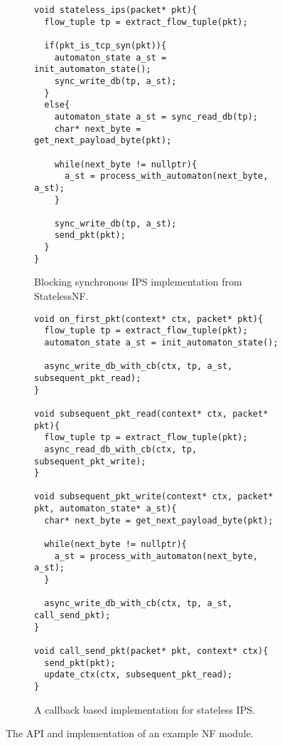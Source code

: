 \begin{figure}[!t]
	\begin{subfigure}[b]{\columnwidth}
		\centering
 	 	\lstset{language=C, numbers=left, showspaces=false,
    		showstringspaces=false, tabsize=2, breaklines=true,
    		xleftmargin=5.0ex, basicstyle=\scriptsize,
		}

		\begin{lstlisting}
void stateless_ips(packet* pkt){
  flow_tuple tp = extract_flow_tuple(pkt);

  if(pkt_is_tcp_syn(pkt)){
    automaton_state a_st = init_automaton_state();
    sync_write_db(tp, a_st);
  }
  else{
    automaton_state a_st = sync_read_db(tp);
    char* next_byte = get_next_payload_byte(pkt);

    while(next_byte != nullptr){
      a_st = process_with_automaton(next_byte, a_st);
    }

    sync_write_db(tp, a_st);
    send_pkt(pkt);
  }
}
		\end{lstlisting}
		\caption{Blocking synchronous IPS implementation from StatelessNF.}
		\label{fig:api}
    \end{subfigure}\hfill
	\begin{subfigure}[b]{\columnwidth}
		\centering
 	 	\lstset{language=C++, numbers=left, showspaces=false,
    		showstringspaces=false, tabsize=2, breaklines=true,
    		xleftmargin=5.0ex, basicstyle=\scriptsize,
		}

		\begin{lstlisting}
void on_first_pkt(context* ctx, packet* pkt){
  flow_tuple tp = extract_flow_tuple(pkt);
  automaton_state a_st = init_automaton_state();

  async_write_db_with_cb(ctx, tp, a_st, subsequent_pkt_read);
}

void subsequent_pkt_read(context* ctx, packet* pkt){
  flow_tuple tp = extract_flow_tuple(pkt);
  async_read_db_with_cb(ctx, tp, subsequent_pkt_write);
}

void subsequent_pkt_write(context* ctx, packet* pkt, automaton_state* a_st){
  char* next_byte = get_next_payload_byte(pkt);

  while(next_byte != nullptr){
    a_st = process_with_automaton(next_byte, a_st);
  }

  async_write_db_with_cb(ctx, tp, a_st, call_send_pkt);
}

void call_send_pkt(packet* pkt, context* ctx){
  send_pkt(pkt);
  update_ctx(ctx, subsequent_pkt_read);
}
		\end{lstlisting}
		\caption{A callback based implementation for stateless IPS.}\label{fig:example}
	\end{subfigure}
\caption{The API and implementation of an example NF module.}
\label{fig:base-class}
\end{figure}
